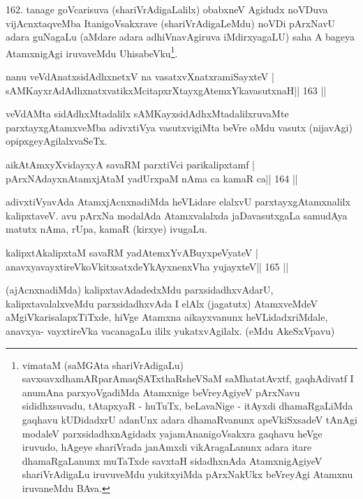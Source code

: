\begin{artha}
162. tanage goVcarisuva (shariVrAdigaLalilx) obabxneV Agidudx noVDuva  vijAcnxtaqveMba ItanigoVsakxrave (shariVrAdigaLeMdu) noVDi pArxNavU adara guNagaLu (aMdare adara adhiVnavAgiruva iMdirxyagaLU) saha A bageya AtamxnigAgi iruvaveMdu UhisabeVku\footnote{vimataM (saMGAta shariVrAdigaLu) savxsavxdhamARparAmaqSATxthaRsheVSaM saMhatatAvxtf, gaqhAdivatf  \mdash  I anumAna parxyoVgadiMda Atamxnige beVreyAgiyeV pArxNavu sididhxsuvadu, tAtapxyaR - huTuTx, beLavaNige - itAyxdi dhamaRgaLiMda gaqhavu kUDidadxrU adanUnx adara dhamaRvanunx apeVkiSxsadeV tAnAgi modaleV parxsidadhxnAgidadx yajamAnanigoVsakxra gaqhavu heVge iruvudo, hAgeye shariVrada janAmxdi vikAragaLanunx adara itare dhamaRgaLanunx muTaTxde savxtaH sidadhxnAda AtamxnigAgiyeV shariVrAdigaLu iruvuveMdu yukitxyiMda pArxNakUkx beVreyAgi Atamxnu iruvaneMdu BAva.}.
\end{artha}


\begin{shl}
nanu veVdAnatxsidAdhxnetxV na vasatxvXnatxramiSayxteV |
sAMKayxrAdAdhxnatxvatikxMcitapxrXtayxgAtemxYkavasutxnaH\hfill || 163 ||
\end{shl}

\begin{artha}
veVdAMta sidAdhxMtadalilx sAMKayxsidAdhxMtadalilxruvaMte  parxtayxgAtamxveMba adivxtiVya vasutxvigiMta beVre oMdu vasutx (nijavAgi) opipxgeyAgilalxvaSeTx.
\end{artha}

\begin{shl}
aikAtAmxyXvidayxyA savaRM parxtiVci parikalipxtamf |
pArxNAdayxnAtamxjAtaM yadUrxpaM nAma ca kamaR ca\hfill || 164 ||
\end{shl}

\begin{artha}
adivxtiVyavAda AtamxjAcnxnadiMda heVLidare elalxvU parxtayxgAtamxnalilx  kalipxtaveV. avu pArxNa modalAda Atamxvalalxda jaDavasutxgaLa samudAya matutx nAma, rUpa, kamaR (kirxye) ivugaLu.
\end{artha}

\begin{shl}
kalipxtAkalipxtaM savaRM yadA\s\s temxYvABuyxpeVyateV |
anavxyavayxtireVkoVkitxsatxdeYkAyxnenxVha yujayxteV\hfill || 165 ||
\end{shl}

\begin{artha}
(ajAcnxnadiMda) kalipxtavAdadedxMdu parxsidadhxvAdarU, 
kalipxtavalalxveMdu parxsidadhxvAda I elAlx (jagatutx) AtamxveMdeV aMgiVkarisalapxTiTxde, hiVge Atamxna aikayxvanunx heVLidadxriMdale, anavxya- vayxtireVka vacanagaLu ililx yukatxvAgilalx. (eMdu AkeSxVpavu)
\end{artha}

